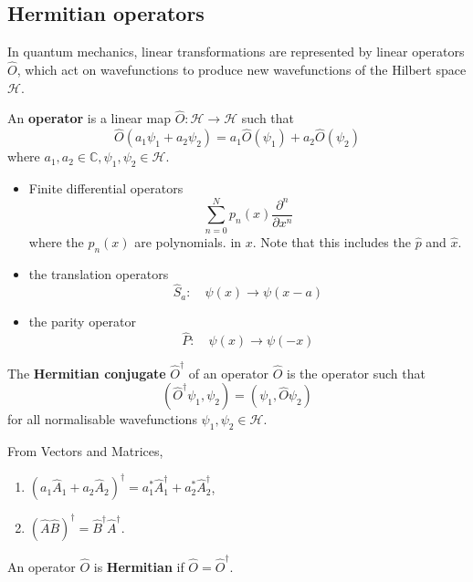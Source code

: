 \documentclass[a4paper]{article}
\begin{document}
\subsection{Hermitian operators}
In quantum mechanics, linear transformations are represented by linear operators $\hat{O}$, which act on wavefunctions to produce new wavefunctions of the Hilbert space $\mathcal{H}$.

\begin{definition}
	An \textbf{operator} is a linear map \(\hat{O}: \mathcal H \to \mathcal H \) such that
	\[
		\hat O(a_1 \psi_1 + a_2 \psi_2) = a_1 \hat O(\psi_1) + a_2 \hat O(\psi_2)
	\]
	where \( a_1, a_2 \in \mathbb C, \psi_1, \psi_2 \in \mathcal H \).
\end{definition}

\begin{example}
\begin{itemize}
    \item Finite differential operators
    \[
    \sum_{n=0}^N p_n(x) \frac{\partial^n}{\partial x^n}
    \]
    where the $p_n(x)$ are polynomials. in $x$. Note that this includes the $\hat{p}$ and $\hat{x}$.
    \item the translation operators
    \[
    \hat{S}_a: \quad \psi(x) \rightarrow \psi(x-a)
    \]
    \item the parity operator
    \[
    \hat P: \quad \psi(x) \rightarrow \psi(-x)
    \]
\end{itemize}
\end{example}

\begin{definition}
    The \textbf{Hermitian conjugate} $\hat{O}^{\dagger}$ of an operator $\hat{O}$ is the operator such that
    \[
    \left(\hat{O}^{\dagger} \psi_1, \psi_2\right)=\left(\psi_1, \hat{O} \psi_2\right)
    \]
    for all normalisable wavefunctions $\psi_1, \psi_2 \in \mathcal{H}$.
\end{definition}
From Vectors and Matrices, 
\begin{enumerate}
    \item $\left(a_1 \hat{A}_1+a_2 \hat{A}_2\right)^{\dagger}=a_1^* \hat{A}_1^{\dagger}+a_2^* \hat{A}_2^{\dagger}$,
    \item $(\hat{A} \hat{B})^{\dagger}=\hat{B}^{\dagger} \hat{A}^{\dagger}$.
\end{enumerate}
\begin{definition}
    An operator $ \hat{O} $ is \textbf{Hermitian} if $ \hat{O} = \hat{O}^{\dagger} $.
\end{definition}
\end{document}
